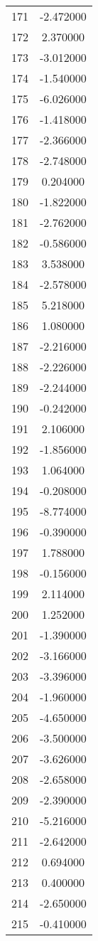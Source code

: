 \documentclass[12pt]{article}
\begin{document}
\begin{longtable}{@{}cc@{}}
171 & -2.472000 \\
172 & 2.370000 \\
173 & -3.012000 \\
174 & -1.540000 \\
175 & -6.026000 \\
176 & -1.418000 \\
177 & -2.366000 \\
178 & -2.748000 \\
179 & 0.204000 \\
180 & -1.822000 \\
181 & -2.762000 \\
182 & -0.586000 \\
183 & 3.538000 \\
184 & -2.578000 \\
185 & 5.218000 \\
186 & 1.080000 \\
187 & -2.216000 \\
188 & -2.226000 \\
189 & -2.244000 \\
190 & -0.242000 \\
191 & 2.106000 \\
192 & -1.856000 \\
193 & 1.064000 \\
194 & -0.208000 \\
195 & -8.774000 \\
196 & -0.390000 \\
197 & 1.788000 \\
198 & -0.156000 \\
199 & 2.114000 \\
200 & 1.252000 \\
201 & -1.390000 \\
202 & -3.166000 \\
203 & -3.396000 \\
204 & -1.960000 \\
205 & -4.650000 \\
206 & -3.500000 \\
207 & -3.626000 \\
208 & -2.658000 \\
209 & -2.390000 \\
210 & -5.216000 \\
211 & -2.642000 \\
212 & 0.694000 \\
213 & 0.400000 \\
214 & -2.650000 \\
215 & -0.410000 \\

\end{longtable}
\end{document}
